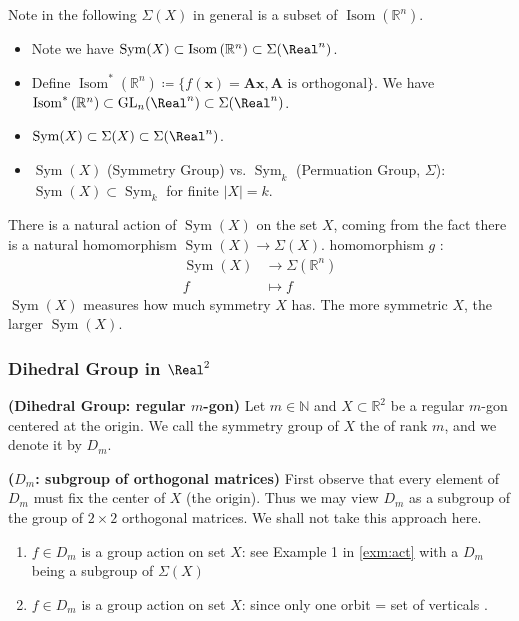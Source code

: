 \documentclass{article}
\newcommand{\bfs}[1]{\textbf{({#1}) }}
\newcommand{\Sym}{\operatorname{Sym}}
\newcommand{\GL}{\operatorname{GL}}
\begin{document}
\begin{rema}\label{rm:somegroupsrelateion} Note in the following $\Sigma(X)$ in general is  a subset of $\operatorname{Isom}\left(\mathbb{R}^{n}\right)$.
\begin{itemize}
    \item Note we have $\operatorname{Sym}(X) \subset \operatorname{Isom}\left(\mathbb{R}^{n}\right)\subset \Sigma(\Real^n)$.
    \item Define $\operatorname{Isom}^*\left(\mathbb{R}^{n}\right)\coloneqq\{f(\boldsymbol{x})=\boldsymbol{A} \boldsymbol{x}, \boldsymbol{A} \text{ is orthogonal}\}$. We have $\operatorname{Isom}^*\left(\mathbb{R}^{n}\right) \subset \GL_n(\Real^n) \subset \Sigma(\Real^n)$. 
    \item $\operatorname{Sym}(X) \subset \Sigma(X)\subset \Sigma(\Real^n)$.
    \item  $\operatorname{Sym}(X)$ (Symmetry Group) vs.  $\Sym_k$ (Permuation Group, $\Sigma$): $\operatorname{Sym}(X) \subset \Sym_k$ for finite $|X|=k$.
\end{itemize}

\end{rema}
There is a natural action of $\operatorname{Sym}(X)$ on the set $X$, coming from the fact there is a natural homomorphism $\operatorname{Sym}(X) \rightarrow \Sigma(X)$.
homomorphism $g$ :
\begin{align*}
\Sym(X) &\rightarrow \Sigma(\mathbb{R}^n)\\
f &\mapsto f
\end{align*}
$\operatorname{Sym}(X)$ measures how much symmetry $X$ has. The more symmetric $X$, the larger $\operatorname{Sym}(X)$.

\subsubsection{Dihedral Group in $\Real^2$}

\begin{defa}{\bfs{Dihedral Group: regular $m$-gon}}
 Let $m \in \mathbb{N}$ and $X \subset \mathbb{R}^{2}$ be a regular $m$-gon centered at the origin. We call the symmetry group of $X$ the  of rank $m$, and we denote it by $D_{m}$.
\end{defa}
\begin{rema}{\bfs{$D_{m}$: subgroup of orthogonal matrices}}
First observe that every element of $D_{m}$ must fix the center of $X$ (the origin). Thus we may view $D_{m}$ as a subgroup of the group of $2 \times 2$ orthogonal matrices. We shall not take this approach here.
\end{rema}
\begin{enumerate}
    \item $f \in D_{m}$ is a group action  on set  $X$: see Example 1 in \cref{exm:act} with a $D_{m}$ being a subgroup of $\Sigma(X)$
    \item $f \in D_{m}$ is a group action  on set  $X$: since only one orbit = set of verticals . 
\end{enumerate}
\end{document}
